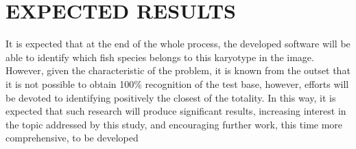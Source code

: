 \chapter{EXPECTED RESULTS}\label{cap:Resultados}

It is expected that at the end of the whole process, the developed software will be able to identify which fish species belongs to this karyotype in the image. However, given the characteristic of the problem, it is known from the outset that it is not possible to obtain 100\% recognition of the test base, however, efforts will be devoted to identifying positively the closest of the totality. In this way, it is expected that such research will produce significant results, increasing interest in the topic addressed by this study, and encouraging further work, this time more comprehensive, to be developed

%